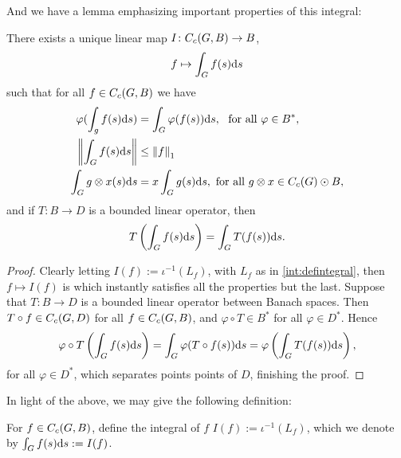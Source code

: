 And we have a lemma emphasizing important properties of this integral:
\begin{lemma}
There exists a unique linear map $I \colon C_c(G,B) \to B$,
\begin{align*}
	f \mapsto \int_G f(s) \mathrm{d} s
\end{align*}
such that for all $f \in C_c(G,B)$ we have
\begin{align}
	\varphi(\int_g f(s) \d s ) &= \int_G \varphi(f(s)) \d s, \ \text{ for all } \varphi \in B^*,\\
	\lv \int_G f(s) \d s \rv &\leq \lv f \rv_1 \\
	\int_G g \otimes x (s) \d s &=x \int_G g(s) \d s, \text{ for all } g \otimes x \in \cc(G) \odot B,
\end{align}
and if $T \colon B \to D$ is a bounded linear operator, then
\begin{align*}
	T\left( \int_G f(s) \mathrm{d} s \right) = \int_G T(f(s)) \mathrm{d} s.
\end{align*}
	\label{int:bochnerproperties}
\end{lemma}
\begin{proof}
	Clearly letting $I(f) := \iota^{-1}(L_f)$, with $L_f$ as in \ref{int:defintegral}, then $f \mapsto I(f)$ is which instantly satisfies all the properties but the last. Suppose that $T \colon B \to D$ is a bounded linear operator between Banach spaces. Then $T \circ f \in C_c(G,D)$ for all $f \in C_c(G,B)$, and $\varphi \circ T \in B^*$ for all $ \varphi \in D^*$. Hence 
	\begin{align*}
		\varphi \circ T \left( \int_G f(s) \mathrm{d} s  \right) = \int_G \varphi( T \circ f (s) ) \mathrm{d} s = \varphi \left( \int_G T (f(s)) \mathrm{d} s \right),
	\end{align*}
	for all $\varphi \in D^*$, which separates points points of $D$, finishing the proof.
\end{proof}
In light of the above, we may give the following definition:
\begin{definition}
	For $f \in C_c(G,B)$, define the integral of $f$ $I(f) := \iota^{-1}(L_f)$, which we denote by $\int_G f(s) \mathrm{d} s := I(f)$.
\end{definition}

